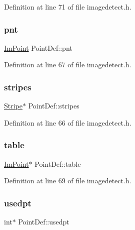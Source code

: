 Definition at line 71 of file imagedetect.\+h.

\mbox{\label{struct_point_def_a57d6fc91e962f787ae4b3f10dffce2d3}} 
\subsubsection{\texorpdfstring{pnt}{pnt}}
{\footnotesize\ttfamily \mbox{\hyperlink{struct_im_point}{Im\+Point}} Point\+Def\+::pnt}



Definition at line 67 of file imagedetect.\+h.

\mbox{\label{struct_point_def_a5bee789a974c549763b215a62d6d0e49}} 
\subsubsection{\texorpdfstring{stripes}{stripes}}
{\footnotesize\ttfamily \mbox{\hyperlink{struct_stripe}{Stripe}}$\ast$ Point\+Def\+::stripes}



Definition at line 66 of file imagedetect.\+h.

\mbox{\label{struct_point_def_a5edc03772cc495cf4cd39a5ce4c4d312}} 
\subsubsection{\texorpdfstring{table}{table}}
{\footnotesize\ttfamily \mbox{\hyperlink{struct_im_point}{Im\+Point}}$\ast$ Point\+Def\+::table}



Definition at line 69 of file imagedetect.\+h.

\mbox{\label{struct_point_def_a70b6cd480af28582e3048fa8272563f3}} 
\subsubsection{\texorpdfstring{usedpt}{usedpt}}
{\footnotesize\ttfamily int$\ast$ Point\+Def\+::usedpt}




